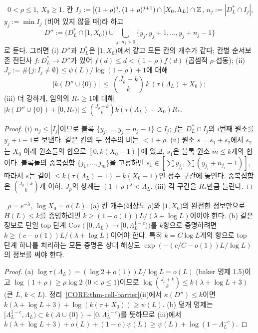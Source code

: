\begin{theorem}\label{CORE:thm-cell-barrier}
\PROVED\ $0<\rho\le1$, $X_0\ge1$. 칸 $I_j:=[(1+\rho)^j,(1+\rho)^{j+1})\cap[X_0,\Lambda_L)\cap\mathbb{Z}$, $n_j:=|D^*_L\cap I_j|$, $y_j:=\min I_j$ (비어 있지 않을 때)라 하고
\[
D'':=\bigl(D^*_L\cap[1,X_0)\bigr)\cup\bigcup_{j:\,n_j>0}\{y_j,y_j+1,\dots,y_j+n_j-1\}
\]
로 둔다. 그러면 (i) $D''$과 $D^*_L$은 $[1,X_0)$에서 같고 모든 칸의 개수가 같다; 칸별 순서보존 전단사 $f:D^*_L\to D''$가 있어 $f(d)\le d<(1+\rho)f(d)$ (곱셈적 $\rho$-섭동); (ii) $J_\rho:=\#\{j:I_j\ne\emptyset\}\le\psi(L)/\log(1+\rho)+1$에 대해
\[
|k(D''\cup\{0\})|\ \le\ \binom{J_\rho+k}{k}\,k\,(\tau(\Lambda_L)+X_0);
\]
(iii) 더 강하게, 임의의 $R_*\ge1$에 대해 $|k(D''\cup\{0\})+[0,R_*)|\le\binom{J_\rho+k}{k}k(\tau(\Lambda_L)+X_0)R_*$.
\end{theorem}
\begin{proof}
(i) $n_j\le|I_j|$이므로 블록 $\{y_j,\dots,y_j+n_j-1\}\subset I_j$; $f$는 $D^*_L\cap I_j$의 $i$번째 원소를 $y_j+i-1$로 보낸다. 같은 칸의 두 정수의 비는 $<1+\rho$. (ii) 원소 $s=s_1+s_2$에서 $s_2$는 $X_0$ 아래 원소들의 합으로 $[0,k(X_0-1)]$에 있고, $s_1$은 블록 원소 $m\le k$개의 합이다. 블록들의 중복집합 $\{j_1,\dots,j_m\}$을 고정하면 $s_1\in[\sum y_{j_i},\sum(y_{j_i}+n_{j_i}-1)]$, 따라서 $s$는 길이 $\le k(\tau(\Lambda_L)-1)+k(X_0-1)$인 정수 구간에 놓인다. 중복집합은 $\binom{J_\rho+k}{k}$개 이하. $J_\rho$의 상계는 $(1+\rho)^j<\Lambda_L$. (iii) 각 구간을 $R_*$만큼 늘린다.
\end{proof}

\begin{corollary}\label{CORE:cor-cell}
\PROVED\ $\rho=e^{-\lambda}$, $\log X_0=o(L)$.
(a) 칸 개수(해상도 $\rho$)와 $[1,X_0)$의 완전한 정보만으로 $H(L)\le k$를 증명하려면 $k\ge(1-o(1))L/(\lambda+\log L)$이어야 한다.
(b) 같은 정보로 단일 top 단계 $\mathrm{Cov}([0,\Lambda_L)\to[0,\Lambda_L^{1-c}))$를 $k$항으로 증명하려면 $k\ge(c-o(1))L/(\lambda+\log L)$이어야 한다. 특히 $k=C\log L$개의 항으로 top 단계 하나를 처리하는 모든 증명은 상대 해상도 $\exp(-(c/C-o(1))L/\log L)$의 정보를 써야 한다.
\end{corollary}
\begin{proof}
(a) $\log\tau(\Lambda_L)=(\log2+o(1))L/\log L=o(L)$ (baker 명제 1.5)이고 $\log(1+\rho)\ge\rho\log 2$ ($0<\rho\le1$)이므로 $\log\binom{J_\rho+k}{k}\le k(\lambda+\log L+3)$ (큰 $L$, $k<L$). 정리~\ref{CORE:thm-cell-barrier}(ii)에서 $\kappa(D'')\le k$이면 $k(\lambda+\log L+3)+\log(k(\tau+X_0))\ge\psi(L)$.
(b) 덮개 명제는 $[\Lambda_L^{1-c},\Lambda_L)\subset k(A\cup\{0\})+[0,\Lambda_L^{1-c})$를 뜻하므로 (iii)에서 $k(\lambda+\log L+3)+o(L)+(1-c)\psi(L)\ge\psi(L)+\log(1-\Lambda_L^{-c})$.
\end{proof}

